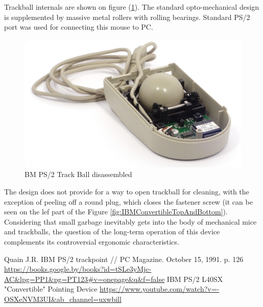 \documentclass[11pt, a4paper]{article}
\begin{document}
Trackball internals are shown on figure (\ref{fig:IBMConvertibleInside}). The standard opto-mechanical design is supplemented by massive metal rollers with rolling bearings. Standard PS/2 port was used for connecting this mouse to PC.

\begin{figure}[h]
    \centering
    \includegraphics[scale=0.7]{1992_ibm_convertible/inside_60.jpg}
    \caption{BM PS/2 Track Ball disassembled}
    \label{fig:IBMConvertibleInside}
\end{figure}

The design does not provide for a way to open trackball for cleaning, with the exception of peeling off a round plug, which closes the fastener screw (it can be seen on the lef part of the Figure \ref{fig:IBMConvertibleTopAndBottom}). Considering that small garbage inevitably gets into the body of mechanical mice and trackballs, the question of the long-term operation of this device complements its controversial ergonomic characteristics.

\begin{thebibliography}{9}
 Quain J.R. IBM PS/2 trackpoint // PC Magazine. October 15, 1991. p. 126 \url{https://books.google.by/books?id=tSLe3yMjc-AC&lpg=PP1&pg=PT123#v=onepage&q&f=false}
 IBM PS/2 L40SX "Convertible" Pointing Device \url{https://www.youtube.com/watch?v=-OSXeNVM3UI&ab_channel=uxwbill}
\end{thebibliography}
\end{document}
